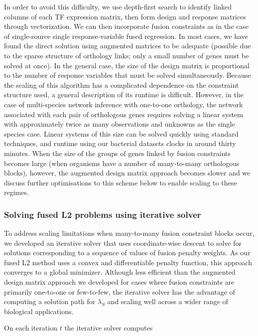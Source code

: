 \documentclass[11pt]{article}
\begin{document}
In order to avoid this difficulty, we use depth-first search to identify linked columns of each TF expression matrix, then form design and response matrices through vectorization. 
We can then incorporate fusion constraints as in the case of single-source single response-variable fused regression. 
In most cases, we have found the direct solution using augmented matrices to be adequate (possible due to the sparse structure of orthology links; only a small number of genes must be solved at once). 
In the general case, the size of the design matrix is proportional to the number of response variables that must be solved simultaneously. 
Because the scaling of this algorithm has a complicated dependence on the constraint structure used, a general description of its runtime is difficult. 
However, in the case of multi-species network inference with one-to-one orthology, the network associated with each pair of orthologous genes requires solving a linear system with approximately twice as many observations and unknowns as the single species case. 
Linear systems of this size can be solved quickly using standard techniques, and runtime using our bacterial datasets clocks in around thirty minutes. 
When the size of the groups of genes linked by fusion constraints becomes large (when organisms have a number of many-to-many orthologous blocks), however, the augmented design matrix approach becomes slower and we discuss further optimisations to this scheme below to enable scaling to these regimes.


\subsubsection{Solving fused L2 problems using iterative solver}

To address scaling limitations when many-to-many fusion constraint blocks occur, we developed an iterative solver that uses coordinate-wise descent to solve for solutions corresponding to a sequence of values of fusion penalty weights. 
As our fused L2 method uses a convex and differentiable penalty function, this approach converges to a global minimizer. 
Although less efficient than the augmented design matrix approach we developed for cases where fusion constraints are primarily one-to-one or few-to-few, the iterative solver has the advantage of computing a solution path for $\lambda_S$ and scaling well across a wider range of biological applications.

On each iteration $t$ the iterative solver computes
\end{document}
